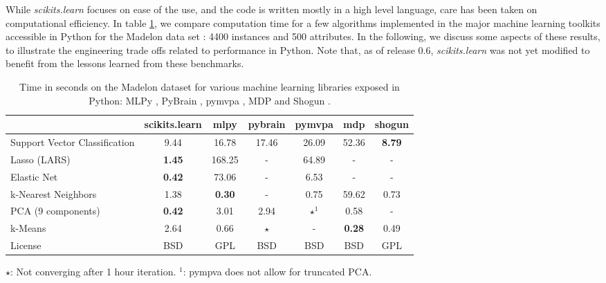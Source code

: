 \documentclass[twoside,11pt]{article}
\begin{document}

While \emph{scikits.learn} focuses on ease of the use, and the code is
written mostly in a high level language, care has been taken on
computational efficiency. In table \ref{tab:comparisons}, we compare
computation time for a few algorithms implemented in the major machine
learning toolkits accessible in Python for the Madelon data set
\citep{Guyon2004}: 4400 instances and 500 attributes.
%
%
In the following, we discuss some aspects of these results, to illustrate
the engineering trade offs related to performance in Python. Note that,
as of release 0.6, \emph{scikits.learn} was not yet modified to benefit
from the lessons learned from these benchmarks.

\begin{table}[h]
\small
\hspace*{.03\linewidth}%
\begin{tabular}{l c c c c c c}
\hline\hline %
 & scikits.learn & mlpy & pybrain & pymvpa &  mdp & shogun \\ [0.5ex]
\hline
Support Vector Classification & 9.44 & 16.78 & 17.46 & 26.09 & 52.36 & {\bf 8.79} \\
Lasso (LARS) & {\bf 1.45} & 168.25   & -       &  64.89     & -    & - \\
Elastic Net & {\bf 0.42} & 73.06 & -  &  6.53  & -  & - \\
k-Nearest Neighbors & 1.38 & {\bf 0.30}  & - &  0.75 & 59.62    & 0.73 \\
PCA (9 components) & {\bf 0.42} & 3.01  & 2.94  & $\star^1$ & 0.58  & - \\
k-Means  & 2.64 & 0.66 & $\star$ & -  & {\bf 0.28} & 0.49 \\
License &  BSD & GPL & BSD  &  BSD  & BSD  & GPL \\
\hline
\end{tabular}

$\star$: Not converging after 1 hour iteration. \hfill $^1$: pympva does
not allow for truncated PCA.
\vspace*{-1.5ex}
\caption{\small
Time in seconds on the Madelon dataset for various machine learning libraries exposed in Python:
MLPy \citep{albanese2008}, PyBrain \citep{schaul2010}, pymvpa
\citep{hanke2009}, MDP \citep{zito2008} and Shogun
\citep{sonnenburg2010}. \label{tab:comparisons}
\vspace*{-1.5em}
}
\end{table}
\end{document}
